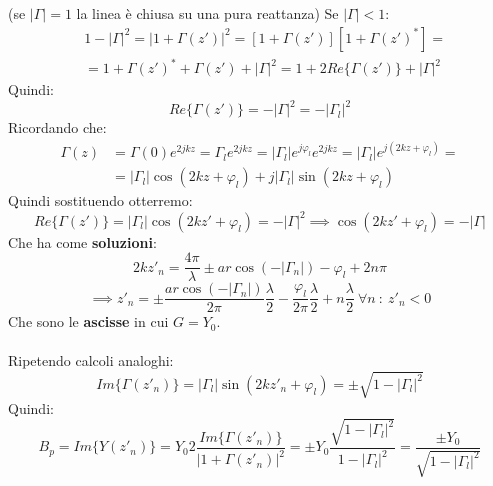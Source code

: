 (se $|\Gamma|=1$ la linea è chiusa su una pura reattanza)
Se $|\Gamma|<1$:
\begin{equation*}
    \begin{aligned}
    &1 - {|\Gamma|}^2 = {|1 + \Gamma(z')|}^2 = [1 + \Gamma(z')][1 + {\Gamma(z')}^*] = \\
    &= 1+ {\Gamma(z')}^* + \Gamma(z') + |\Gamma|^2 = 1 + 2Re\{\Gamma(z')\} + |\Gamma|^2
    \end{aligned}
\end{equation*}
Quindi:
\begin{equation*}
    Re\{\Gamma(z')\} = -|\Gamma|^2 = -|\Gamma_l|^2
\end{equation*}
Ricordando che:
\begin{equation*}
    \begin{aligned}
    \Gamma(z) &= \Gamma(0) e^{2jkz} = \Gamma_l e^{2jkz} = |\Gamma_l| e^{j\varphi_l} e^{2jkz} =|\Gamma_l| e^{j(2kz +\varphi_l)} =\\
    &= |\Gamma_l| \cos(2kz +\varphi_l) + j |\Gamma_l| \sin(2kz +\varphi_l)
    \end{aligned}
\end{equation*}
Quindi sostituendo otterremo:
\begin{equation*}
    Re\{\Gamma(z')\} = |\Gamma_l| \cos(2kz' +\varphi_l) = -|\Gamma|^2 \implies \cos(2kz' +\varphi_l) = -|\Gamma|
\end{equation*}
Che ha come \textbf{soluzioni}:
\begin{equation*}
    2k z'_n = \frac{4\pi}{\lambda} \pm ar\cos(-|\Gamma_n|) - \varphi_l + 2n\pi
\end{equation*}
\begin{equation*}
    \implies z'_n = \pm \frac{ar\cos(-|\Gamma_n|)}{2\pi} \frac{\lambda}{2} - \frac{\varphi_l}{2\pi} \frac{\lambda}{2} + n \frac{\lambda}{2} \ \forall n \ : \ z'_n <0
\end{equation*}
Che sono le \textbf{ascisse} in cui $G = Y_0$.\\ \\
Ripetendo calcoli analoghi:
\begin{equation*}
    Im\{\Gamma(z'_n)\} = |\Gamma_l| \sin(2kz'_n +\varphi_l) = \pm \sqrt{1 - |\Gamma_l|^2}
\end{equation*}
Quindi:
\begin{equation*}
    B_p = Im\{Y(z'_n)\} = Y_0 2 \frac{Im\{\Gamma(z'_n)\}}{|1 + \Gamma(z'_n)|^2} = \pm Y_0 \frac{\sqrt{1 - |\Gamma_l|^2}}{1 - |\Gamma_l|^2} = \frac{\pm Y_0}{\sqrt{1 - |\Gamma_l|^2}}
\end{equation*}
